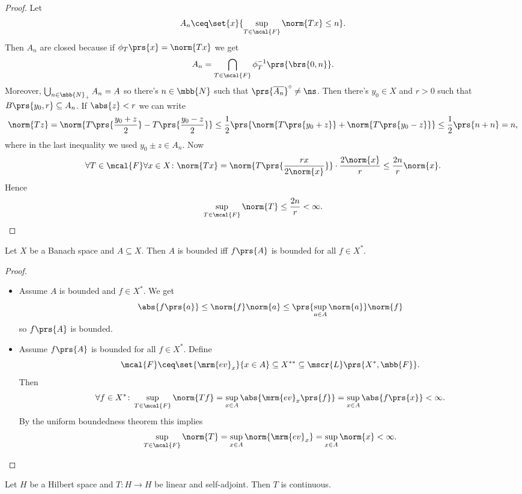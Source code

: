 \documentclass[10pt, twoside]{book}
\begin{document}
\begin{proof}
Let
\[A_n \ceq \set{x}{\sup_{T \in \mcal{F}} \norm{Tx} \leq n} \text{.}\]
Then $A_n$ are closed because if $\phi_T\prs{x} = \norm{Tx}$ we get \[A_n = \bigcap_{T \in \mcal{F}} \phi_T^{-1} \prs{\brs{0,n}} \text{.}\]
Moreover, $\bigcup_{n \in \mbb{N}_+} A_n = A$ so there's $n \in \mbb{N}$ such that $\prs{\overline{A_n}}^\circ \neq \ns$. Then there's $y_0 \in X$ and $r > 0$ such that $B\prs{y_0, r} \subseteq A_n$.
If $\abs{z} < r$ we can write
\[\norm{Tz} = \norm{T \prs{\frac{y_0 + z}{2}} - T \prs{\frac{y_0 - z}{2}}} \leq \frac{1}{2} \prs{\norm{T \prs{y_0 + z}} + \norm{T \prs{y_0 - z}}} \leq \frac{1}{2} \prs{n+n} = n \text{,}\]
where in the last inequality we used $y_0 \pm z \in A_n$.
Now
\[\forall T \in \mcal{F} \forall x \in X \colon \norm{Tx} = \norm{T \prs{\frac{r x}{2 \norm{x}}}} \cdot \frac{2 \norm{x}}{r} \leq \frac{2n}{r} \norm{x} \text{.}\]
Hence
\[\sup_{T \in \mcal{F}} \norm{T} \leq \frac{2n}{r} < \infty \text{.}\]
\end{proof}

\begin{corollary}
Let $X$ be a Banach space and $A \subseteq X$. Then $A$ is bounded iff $f\prs{A}$ is bounded for all $f \in X^*$.
\end{corollary}

\begin{proof}
\begin{itemize}
\item Assume $A$ is bounded and $f \in X^*$. We get
\[\abs{f\prs{a}} \leq \norm{f} \norm{a} \leq \prs{\sup_{a \in A} \norm{a}}\norm{f}\]
so $f\prs{A}$ is bounded.

\item Assume $f\prs{A}$ is bounded for all $f \in X^*$. Define
\[\mcal{F} \ceq \set{\mrm{ev}_x}{x \in A} \subseteq X^{**} \subseteq \mscr{L}\prs{X^*, \mbb{F}} \text{.}\]
Then
\begin{align*}
\forall f \in X^* \colon \sup_{T \in \mcal{F}} \norm{Tf} = \sup_{x \in A} \abs{\mrm{ev}_x\prs{f}} = \sup_{x \in A} \abs{f\prs{x}} < \infty \text{.}
\end{align*}
By the uniform boundedness theorem this implies
\[\sup_{T \in \mcal{F}} \norm{T} = \sup_{x \in A} \norm{\mrm{ev}_x} = \sup_{x \in A} \norm{x} < \infty \text{.}\]
\end{itemize}
\end{proof}

\begin{proposition}
Let $H$ be a Hilbert space and $T \colon H \to H$ be linear and self-adjoint. Then $T$ is continuous.
\end{proposition}
\end{document}
